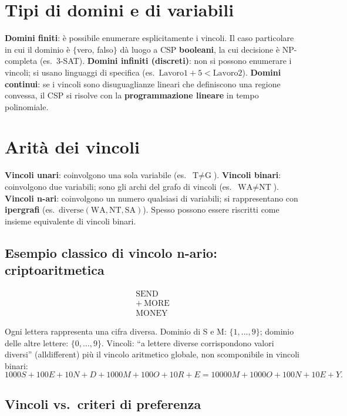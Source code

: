 \documentclass[11pt,a4paper]{report}
\begin{document}
\section{Tipi di domini e di variabili}

\textbf{Domini finiti}: è possibile enumerare esplicitamente i vincoli. Il caso particolare in cui il dominio è $\{$vero, falso$\}$ dà luogo a CSP \textbf{booleani}, la cui decisione è NP-completa (es.\ 3-SAT). \textbf{Domini infiniti (discreti)}: non si possono enumerare i vincoli; si usano linguaggi di specifica (es.\ $\text{Lavoro1}+5 < \text{Lavoro2}$). \textbf{Domini continui}: se i vincoli sono disuguaglianze lineari che definiscono una regione convessa, il CSP si risolve con la \textbf{programmazione lineare} in tempo polinomiale.

\section{Arità dei vincoli}

\textbf{Vincoli unari}: coinvolgono una sola variabile (es.\ $\text{T}\ne\text{G}$). \textbf{Vincoli binari}: coinvolgono due variabili; sono gli archi del grafo di vincoli (es.\ $\text{WA}\ne\text{NT}$). \textbf{Vincoli n-ari}: coinvolgono un numero qualsiasi di variabili; si rappresentano con \textbf{ipergrafi} (es.\ $\text{diverse}(\text{WA},\text{NT},\text{SA})$). Spesso possono essere riscritti come insieme equivalente di vincoli binari.

\subsection*{Esempio classico di vincolo n-ario: criptoaritmetica}

\[
\begin{array}{r}
\text{SEND} \\
+\ \text{MORE} \\
\hline
\text{MONEY}
\end{array}
\]

Ogni lettera rappresenta una cifra diversa. Dominio di S e M: $\{1,\dots,9\}$; dominio delle altre lettere: $\{0,\dots,9\}$. Vincoli: ``a lettere diverse corrispondono valori diversi'' (alldifferent) più il vincolo aritmetico globale, non scomponibile in vincoli binari:
\[
1000S+100E+10N+D+1000M+100O+10R+E = 10000M+1000O+100N+10E+Y.
\]

\subsection*{Vincoli vs.\ criteri di preferenza}
\end{document}
